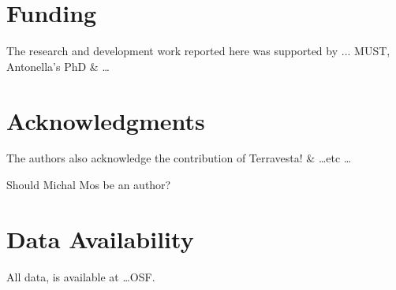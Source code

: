 \documentclass[fleqn, 15pt, lineno]{olplainarticle}
\begin{document}
\section*{Funding}
The research and development work reported here was supported by ... MUST, Antonella's PhD \& \dots


\section*{Acknowledgments}
The authors also acknowledge the contribution of Terravesta! \& \dots etc \dots

Should Michal Mos be an author?

\section{Data Availability}
All data, is available at \dots OSF.


\end{document}
